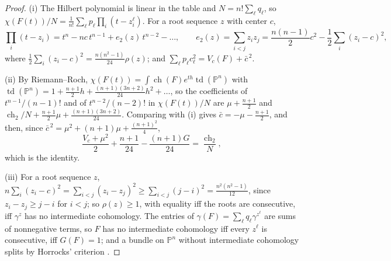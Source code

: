 \documentclass[11pt]{amsart}
\theoremstyle{definition}
\theoremstyle{remark}
\newcommand{\PP}{\mathbb{P}}
\begin{document}
\begin{proof}
(i) The Hilbert polynomial is linear in the table and $N=n!\sum_\ell q_\ell$, so $\chi(F(t))/N=\frac1{n!}\sum_\ell p_\ell\prod_i(t-z^\ell_i)$. For a root sequence $z$ with center $c$,
\[
\prod_i(t-z_i)=t^n-nc\,t^{n-1}+e_2(z)\,t^{n-2}-\dots,\qquad e_2(z)=\sum_{i<j}z_iz_j=\frac{n(n-1)}2c^2-\frac12\sum_i(z_i-c)^2 ,
\]
where $\frac12\sum_i(z_i-c)^2=\frac{n(n^2-1)}{24}\rho(z)$; and $\sum_\ell p_\ell c_\ell^2=V_c(F)+\bar c^{\,2}$.

(ii) By Riemann--Roch, $\chi(F(t))=\int\operatorname{ch}(F)e^{th}\operatorname{td}(\PP^n)$ with $\operatorname{td}(\PP^n)=1+\frac{n+1}2h+\frac{(n+1)(3n+2)}{24}h^2+\dots$, so the coefficients of $t^{n-1}/(n-1)!$ and of $t^{n-2}/(n-2)!$ in $\chi(F(t))/N$ are $\mu+\frac{n+1}2$ and $\operatorname{ch}_2/N+\frac{n+1}2\mu+\frac{(n+1)(3n+2)}{24}$. Comparing with (i) gives $\bar c=-\mu-\frac{n+1}2$, and then, since $\bar c^{\,2}=\mu^2+(n+1)\mu+\frac{(n+1)^2}4$,
\[
\frac{V_c+\mu^2}2+\frac{n+1}{24}-\frac{(n+1)G}{24}=\frac{\operatorname{ch}_2}N ,
\]
which is the identity.

(iii) For a root sequence $z$, $n\sum_i(z_i-c)^2=\sum_{i<j}(z_i-z_j)^2\ge\sum_{i<j}(j-i)^2=\frac{n^2(n^2-1)}{12}$, since $z_i-z_j\ge j-i$ for $i<j$; so $\rho(z)\ge1$, with equality iff the roots are consecutive, iff $\gamma^z$ has no intermediate cohomology. The entries of $\gamma(F)=\sum_\ell q_\ell\gamma^{z^\ell}$ are sums of nonnegative terms, so $F$ has no intermediate cohomology iff every $z^\ell$ is consecutive, iff $G(F)=1$; and a bundle on $\PP^n$ without intermediate cohomology splits by Horrocks' criterion \cite{Ho64}.


\end{proof}
\end{document}
